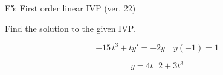 \begin{exercise}
  \begin{exerciseTitle}F5: First order linear IVP (ver. 22)\end{exerciseTitle}
  \begin{exerciseStatement}
    
Find the solution to the given IVP.

    
\[-15 \, t^{3} +ty'= -2 y \hspace{1em} y( -1 ) = 1\]

  \end{exerciseStatement}
  \begin{exerciseAnswer}
    
\[y= 4 t^ -2 +3 t^{3}\]

  \end{exerciseAnswer}
\end{exercise}